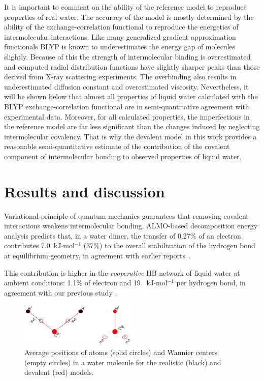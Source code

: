 \documentclass[aps,prl,reprint,amsmath,amssymb]{revtex4-1}
\begin{document}
It is important to comment on the ability of the reference model to reproduce properties of real water. 
The accuracy of the model is mostly determined by the ability of the exchange-correlation functional to reproduce the energetics of intermolecular interactions. Like many generalized gradient approximation functionals BLYP is known to underestimates the energy gap of molecules slightly. 
Because of this the strength of intermolecular binding is overestimated and computed radial distribution functions have slightly sharper peaks than those derived from X-ray scattering experiments. 
The overbinding also results in underestimated diffusion constant and overestimated viscosity. 
Nevertheless, it will be shown below that almost all properties of liquid water calculated with the BLYP exchange-correlation functional are in semi-quantitative agreement with experimental data. 
Moreover, for all calculated properties, the imperfections in the reference model are far less significant than the changes induced by neglecting intermolecular covalency. 
That is why the devalent model in this work provides a reasonable semi-quantitative estimate of the contribution of the covalent component of intermolecular bonding to observed properties of liquid water.


\section{Results and discussion}

Variational principle of quantum mechanics guarantees that removing covalent interactions weakens intermolecular bonding. 
ALMO-based decomposition energy analysis predicts that, in a water dimer, the transfer of 0.27\% of an electron contributes  7.0~kJ$\cdot$mol$^{-1}$ (37\%) to the overall stabilization of the hydrogen bond at equilibrium geometry, in agreement with earlier reports~\cite{stevens1987frozen,chen1996energy,piquemal2005csov,khaliullin2009electron}. 

This contribution is higher in the \emph{cooperative} HB network of liquid water at ambient conditions: 1.1\% of electron and 19 ~kJ$\cdot$mol$^{-1}$ per hydrogen bond, in agreement with our previous study \cite{kuhne2014nature}.

\begin{figure}
\includegraphics[width=0.5\textwidth]{acoord}
\caption{Average positions of atoms (solid circles) and Wannier centers (empty circles) in a water molecule for the realistic (black) and devalent (red) models. 
} \label{Fig:acoord}
\end{figure}
\end{document}
